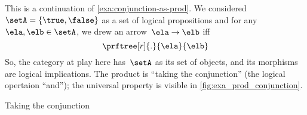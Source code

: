 \begin{example}
    \label{exa:conjunction-as-prod-cont}
    This is a continuation of \cref{exa:conjunction-as-prod}.
    We considered~$\setA = \{ \true, \false \}$ as a set of logical propositions and for any~$\ela, \elb  \in \setA$, we drew an arrow~$\ela \to \elb$ iff
    \begin{equation*}
        \prftree[r]{.
        }{\ela}{\elb}
    \end{equation*}
    So, the category at play here has~$\setA$ as its set of objects, and its morphisms are logical implications.
    The product is ``taking the conjunction'' (the logical opertaion ``and''); the universal property is visible in \cref{fig:exa_prod_conjunction}.
    \begin{marginfigure}
        \centering
        \caption{Taking the conjunction}
        \label{fig:exa_prod_conjunction_cont}
    \end{marginfigure}
\end{example}


